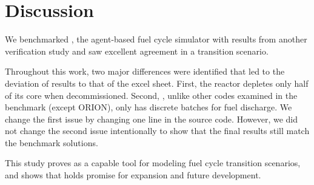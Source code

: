 \section{Discussion}

We benchmarked \Cyclus, the agent-based
fuel cycle simulator with results from another
verification study and saw excellent agreement
in a transition scenario.

Throughout this work, two major differences were identified
that led to the deviation
of \Cyclus results to that of the excel sheet. First,
the \Cycamore reactor depletes only half of its core
when decommissioned. Second, \Cyclus, unlike other
codes examined in the benchmark (except ORION), only has
discrete batches for fuel discharge.
We change the first issue by changing one line in the source code.
However, we did not change the
second issue intentionally to show that the final results
still match the benchmark solutions.

This study proves \Cyclus as a capable tool for modeling
fuel cycle transition scenarios, and shows that \Cyclus holds
promise for expansion and future development.